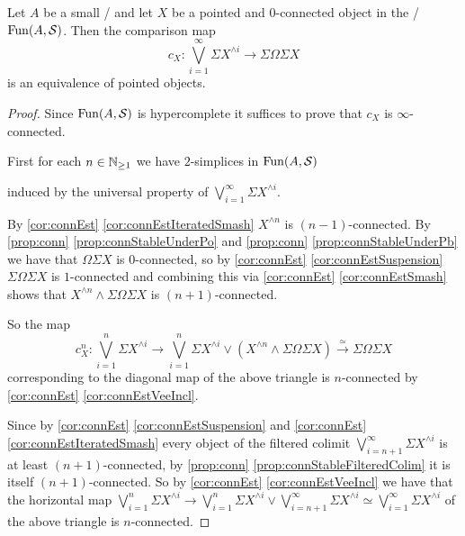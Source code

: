 \begin{prop}\label{prop:jamesSplittingPresheaf} %
    Let $A$ be a small \inftycat/ and let $X$ be a pointed and $0$-connected object in the \inftytop/ $\operatorname{Fun}(A,\mathcal{S})$.
    Then the comparison map 
    \begin{equation*}
        c_X\colon\bigvee\limits_{i=1}^{\infty}\Sigma X^{\wedge i}\to\Sigma\Omega\Sigma X
    \end{equation*}
    is an equivalence of pointed objects. 
    \begin{proof}
        Since $\operatorname{Fun}(A,\mathcal{S})$ is hypercomplete it suffices to prove that $c_X$ is $\infty$-connected.

        First for each $n\in\mathbb{N}_{\geq 1}$ we have $2$-simplices in $\operatorname{Fun}(A,\mathcal{S})$
        \begin{center}
        \end{center}
        induced by the universal property of $\bigvee\limits_{i=1}^{\infty}\Sigma X^{\wedge i}$.

        By \cref{cor:connEst} \ref{cor:connEstIteratedSmash} $X^{\wedge n}$ is $(n-1)$-connected.
        By \cref{prop:conn} \ref{prop:connStableUnderPo} and \cref{prop:conn} \ref{prop:connStableUnderPb} we have that $\Omega\Sigma X$ is $0$-connected, so by \cref{cor:connEst} \ref{cor:connEstSuspension} $\Sigma\Omega\Sigma X$ is $1$-connected and combining this via \cref{cor:connEst} \ref{cor:connEstSmash} shows that $X^{\wedge n}\wedge\Sigma\Omega\Sigma X$ is $(n+1)$-connected.

        So the map 
        \begin{equation*}
            c_X^n\colon\bigvee\limits_{i=1}^n\Sigma X^{\wedge i}\to\bigvee\limits_{i=1}^n\Sigma X^{\wedge i}\vee\left(X^{\wedge n}\wedge\Sigma\Omega\Sigma X\right)\xrightarrow{\simeq}\Sigma\Omega\Sigma X
        \end{equation*}
        corresponding to the diagonal map of the above triangle is $n$-connected by \cref{cor:connEst} \ref{cor:connEstVeeIncl}.

        Since by \cref{cor:connEst} \ref{cor:connEstSuspension} and \cref{cor:connEst} \ref{cor:connEstIteratedSmash} every object of the filtered colimit $\bigvee\limits_{i=n+1}^{\infty}\Sigma X^{\wedge i}$ is at least $(n+1)$-connected, by \cref{prop:conn} \ref{prop:connStableFilteredColim} it is itself $(n+1)$-connected.
        So by \cref{cor:connEst} \ref{cor:connEstVeeIncl} we have that the horizontal map $\bigvee\limits_{i=1}^n\Sigma X^{\wedge i}\to\bigvee\limits_{i=1}^n\Sigma X^{\wedge i}\vee\bigvee\limits_{i=n+1}^{\infty}\Sigma X^{\wedge i}\simeq\bigvee\limits_{i=1}^{\infty}\Sigma X^{\wedge i}$ of the above triangle is $n$-connected.


\end{proof}
\end{prop}
